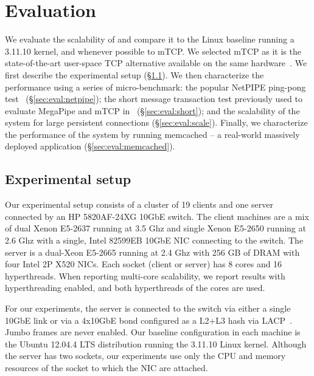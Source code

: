 
\section{Evaluation}
\label{sec:eval}

We evaluate the scalability of \ix and compare it to the Linux
baseline running a 3.11.10 kernel, and whenever possible to mTCP.  We
selected mTCP as it is the state-of-the-art user-space TCP alternative
available on the same hardware~\cite{jeong2014mtcp}.  We first
describe the experimental setup (\S\ref{sec:eval:setup}).  We then
characterize the performance using a series of micro-benchmark: the
popular NetPIPE ping-pong test~\cite{snell1996netpipe}
(\S\ref{sec:eval:netpipe}); the short message transaction test
previously used to evaluate MegaPipe and mTCP
in~\cite{han2012megapipe,jeong2014mtcp} (\S\ref{sec:eval:short}); and
the scalability of the system for large persistent connections
(\S\ref{sec:eval:scale}).  Finally, we characterize the performance of
the \ix system by running memcached -- a real-world massively deployed
application (\S\ref{sec:eval:memcached}).


\subsection{Experimental setup}
\label{sec:eval:setup}

Our experimental setup consists of a cluster of 19 clients and one
server connected by an HP 5820AF-24XG 10GbE switch.  The client
machines are a mix of dual Xenon E5-2637 running at 3.5 Ghz and single Xenon E5-2650 running at 2.6 Ghz with a single, Intel
82599EB 10GbE NIC connecting to the switch.  The server is a dual-Xeon E5-2665
running at 2.4 Ghz with 256 GB of DRAM with four Intel 2P X520 NICs.  Each
socket (client or server) has 8 cores and 16 hyperthreads.  When
reporting multi-core scalability, we report results with
hyperthreading enabled, and both hyperthreads of the cores are used.

For our experiments, the server is connected to the switch via either
a single 10GbE link or via a 4x10GbE bond configured as a L2+L3 hash
via LACP~\cite{ieee802.3ad}. Jumbo frames are never enabled.  Our
baseline configuration in each machine is the Ubuntu 12.04.4 LTS
distribution running the 3.11.10 Linux kernel.  Although the server
has two sockets, our experiments use only the CPU and memory resources
of the socket to which the NIC are attached.  


